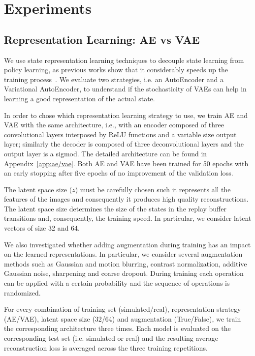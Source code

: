 \chapter{Experiments}

\section{Representation Learning: AE vs VAE}

We use state representation learning techniques to decouple state learning from policy learning, as previous works show that it considerably speeds up the training process~\cite{DBLP:journals/corr/abs-2008-00715,DBLP:journals/corr/abs-1910-01741}. We evaluate two strategies, i.e. an AutoEncoder and a Variational AutoEncoder, to understand if the stochasticity of VAEs can help in learning a good representation of the actual state. 

In order to chose which representation learning strategy to use, we train AE and VAE with the same architecture, i.e., with an encoder composed of three  convolutional layers interposed by ReLU functions and a variable size output layer; similarly the decoder is composed of three deconvolutional layers and the output layer is a sigmod. The detailed architecture can be found in Appendix~\ref{app:ae/vae}. Both AE and VAE have been trained for 50 epochs with an early stopping after five epochs of no improvement of the validation loss.

The latent space size ($z$) must be carefully chosen such it represents all the features of the images and consequently it produces high quality reconstructions. The latent space size determines the size of the states in the replay buffer transitions and, consequently, the training speed. In particular, we consider latent vectors of size 32 and 64.

We also investigated whether adding augmentation during training has an impact on the learned representations. In particular, we consider several augmentation methods such as Gaussian and motion blurring, contrast normalization, additive Gaussian noise, sharpening and coarse dropout. During training each operation can be applied with a certain probability and the sequence of operations is randomized.

For every combination of training set (simulated/real), representation strategy (AE/VAE), latent space size (32/64) and augmentation (True/False), we train the corresponding architecture three times. Each model is evaluated on the corresponding test set (i.e. simulated or real) and the resulting average reconstruction loss is averaged across the three training repetitions.

